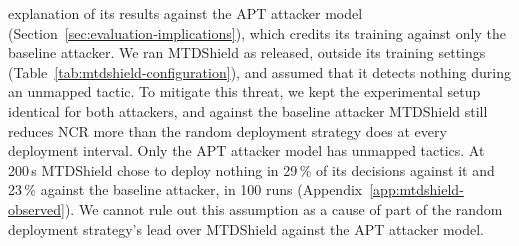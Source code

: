 \documentclass{cshonours}
\begin{document}
\begin{enumerate}[label=T\arabic*, ref=T\arabic*, series=threats, align=left]
explanation of its results against the APT attacker model
(Section~\ref{sec:evaluation-implications}), which credits its training
against only the baseline attacker. We ran MTDShield as released, outside its
training settings (Table~\ref{tab:mtdshield-configuration}), and assumed that it
detects nothing during an unmapped tactic. To mitigate this threat, we kept the experimental setup
identical for both attackers, and against the baseline attacker MTDShield
still reduces NCR more than the random deployment strategy does at every
deployment interval. Only the APT attacker model has unmapped tactics. At
200\,s MTDShield chose to deploy nothing in 29\,\% of its decisions against it
and 23\,\% against the baseline attacker, in 100 runs (Appendix~\ref{app:mtdshield-observed}). We cannot rule out this assumption as a cause of part of
the random deployment strategy's lead over MTDShield against the APT attacker
model.
\end{enumerate}
\end{document}
